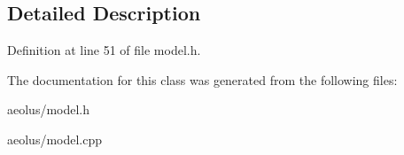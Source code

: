 \subsection{Detailed Description}


Definition at line 51 of file model.\+h.



The documentation for this class was generated from the following files\+:\begin{DoxyCompactItemize}
\item 
aeolus/model.\+h\item 
aeolus/model.\+cpp\end{DoxyCompactItemize}
